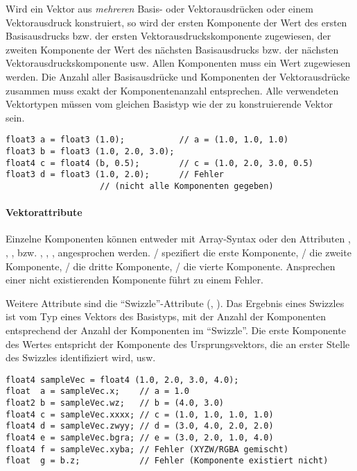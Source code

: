 Wird ein Vektor aus \emph{mehreren} Basis- oder Vektorausdrücken oder einem Vektorausdruck konstruiert,
so wird der ersten Komponente der Wert des ersten Basisausdrucks bzw. der ersten Vektorausdruckskomponente zugewiesen,
der zweiten Komponente der Wert des nächsten Basisausdrucks bzw. der nächsten Vektorausdruckskomponente usw.
Allen Komponenten muss ein Wert zugewiesen werden. Die Anzahl aller Basisausdrücke und Komponenten der Vektorausdrücke
zusammen muss exakt der Komponentenanzahl entsprechen.
Alle verwendeten Vektortypen müssen vom gleichen Basistyp wie der zu konstruierende Vektor sein.

\begin{lstlisting}[basicstyle=\ttfamily\small,lineskip=-11pt]
float3 a = float3 (1.0);           // a = (1.0, 1.0, 1.0)
float3 b = float3 (1.0, 2.0, 3.0);
float4 c = float4 (b, 0.5);        // c = (1.0, 2.0, 3.0, 0.5)
float3 d = float3 (1.0, 2.0);      // Fehler
				   // (nicht alle Komponenten gegeben)
\end{lstlisting}




\paragraph{Vektorattribute}\label{Vektorattribute}
Einzelne Komponenten können entweder mit Array-Syntax oder den Attributen ,
, ,  bzw. , , ,  angesprochen
werden. / spezifiert die erste Komponente,
/ die zweite Komponente, / die dritte Komponente,
/ die vierte Komponente. Ansprechen einer nicht existierenden Komponente
führt zu einem Fehler.

Weitere Attribute sind die "`Swizzle"'-Attribute (, ).
Das Ergebnis eines Swizzles ist vom Typ eines Vektors des Basistyps, mit der Anzahl der Komponenten
entsprechend der Anzahl der Komponenten im "`Swizzle"'. Die erste Komponente des Wertes entspricht
der Komponente des Ursprungsvektors, die an erster Stelle des Swizzles identifiziert wird, usw.

\begin{lstlisting}[basicstyle=\ttfamily\small,lineskip=-11pt]
float4 sampleVec = float4 (1.0, 2.0, 3.0, 4.0);
float  a = sampleVec.x;    // a = 1.0
float2 b = sampleVec.wz;   // b = (4.0, 3.0)
float4 c = sampleVec.xxxx; // c = (1.0, 1.0, 1.0, 1.0)
float4 d = sampleVec.zwyy; // d = (3.0, 4.0, 2.0, 2.0)
float4 e = sampleVec.bgra; // e = (3.0, 2.0, 1.0, 4.0)
float4 f = sampleVec.xyba; // Fehler (XYZW/RGBA gemischt)
float  g = b.z;            // Fehler (Komponente existiert nicht)
\end{lstlisting}



